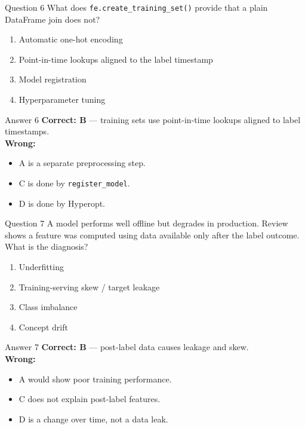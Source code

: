 \documentclass[aspectratio=169,11pt]{beamer}
\begin{document}
	\begin{frame}{Question 6}
		What does \texttt{fe.create\_training\_set()} provide that a plain DataFrame join does not?
		\begin{enumerate}[label=\Alph*.]
			\item Automatic one-hot encoding
			\item Point-in-time lookups aligned to the label timestamp
			\item Model registration
			\item Hyperparameter tuning
		\end{enumerate}
	\end{frame}
	\begin{frame}{Answer 6}
		\textbf{Correct: B} --- training sets use point-in-time lookups aligned to label timestamps.\\
		\vspace{0.5em}
		\textbf{Wrong:}
		\begin{itemize}
			\item A is a separate preprocessing step.
			\item C is done by \texttt{register\_model}.
			\item D is done by Hyperopt.
		\end{itemize}
	\end{frame}
	
	\begin{frame}{Question 7}
		A model performs well offline but degrades in production. Review shows a feature was computed using data available only after the label outcome. What is the diagnosis?
		\begin{enumerate}[label=\Alph*.]
			\item Underfitting
			\item Training-serving skew / target leakage
			\item Class imbalance
			\item Concept drift
		\end{enumerate}
	\end{frame}
	\begin{frame}{Answer 7}
		\textbf{Correct: B} --- post-label data causes leakage and skew.\\
		\vspace{0.5em}
		\textbf{Wrong:}
		\begin{itemize}
			\item A would show poor training performance.
			\item C does not explain post-label features.
			\item D is a change over time, not a data leak.
		\end{itemize}
	\end{frame}
	
\end{document}
